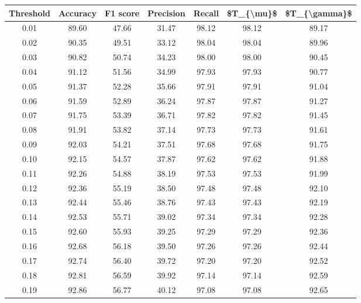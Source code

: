 \begin{tabular}{|c|c|c|c|c|c|c|}
\hline
 Threshold &  Accuracy &  F1 score &  Precision &  Recall &  \$T\_\{\textbackslash mu\}\$ &  \$T\_\{\textbackslash gamma\}\$ \\
\hline
      0.01 &     89.60 &     47.66 &      31.47 &   98.12 &      98.12 &         89.17 \\
      0.02 &     90.35 &     49.51 &      33.12 &   98.04 &      98.04 &         89.96 \\
      0.03 &     90.82 &     50.74 &      34.23 &   98.00 &      98.00 &         90.45 \\
      0.04 &     91.12 &     51.56 &      34.99 &   97.93 &      97.93 &         90.77 \\
      0.05 &     91.37 &     52.28 &      35.66 &   97.91 &      97.91 &         91.04 \\
      0.06 &     91.59 &     52.89 &      36.24 &   97.87 &      97.87 &         91.27 \\
      0.07 &     91.75 &     53.39 &      36.71 &   97.82 &      97.82 &         91.45 \\
      0.08 &     91.91 &     53.82 &      37.14 &   97.73 &      97.73 &         91.61 \\
      0.09 &     92.03 &     54.21 &      37.51 &   97.68 &      97.68 &         91.75 \\
      0.10 &     92.15 &     54.57 &      37.87 &   97.62 &      97.62 &         91.88 \\
      0.11 &     92.26 &     54.88 &      38.19 &   97.53 &      97.53 &         91.99 \\
      0.12 &     92.36 &     55.19 &      38.50 &   97.48 &      97.48 &         92.10 \\
      0.13 &     92.44 &     55.46 &      38.76 &   97.43 &      97.43 &         92.19 \\
      0.14 &     92.53 &     55.71 &      39.02 &   97.34 &      97.34 &         92.28 \\
      0.15 &     92.60 &     55.93 &      39.25 &   97.29 &      97.29 &         92.36 \\
      0.16 &     92.68 &     56.18 &      39.50 &   97.26 &      97.26 &         92.44 \\
      0.17 &     92.74 &     56.40 &      39.72 &   97.20 &      97.20 &         92.52 \\
      0.18 &     92.81 &     56.59 &      39.92 &   97.14 &      97.14 &         92.59 \\
      0.19 &     92.86 &     56.77 &      40.12 &   97.08 &      97.08 &         92.65 \\

\end{tabular}
